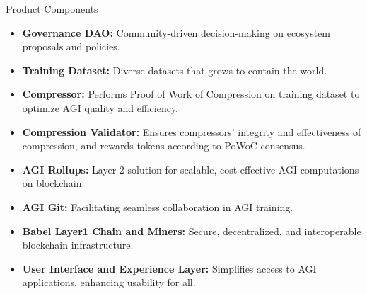 \documentclass{beamer}
\begin{document}
\begin{frame}{Product Components}
    \begin{itemize}
        \item \textbf{Governance DAO:} Community-driven decision-making on ecosystem proposals and policies.
        \item \textbf{Training Dataset:} Diverse datasets that grows to contain the world.
        \item \textbf{Compressor:} Performs Proof of Work of Compression on training dataset to optimize AGI quality and efficiency.
        \item \textbf{Compression Validator:} Ensures compressors' integrity and effectiveness of compression, and rewards tokens according to PoWoC consensus. 
        \item \textbf{AGI Rollups:} Layer-2 solution for scalable, cost-effective AGI computations on blockchain.
        \item \textbf{AGI Git:} Facilitating seamless collaboration in AGI training.
        \item \textbf{Babel Layer1 Chain and Miners:} Secure, decentralized, and interoperable blockchain infrastructure.
        \item \textbf{User Interface and Experience Layer:} Simplifies access to AGI applications, enhancing usability for all.
    \end{itemize}
\end{frame}
\end{document}
